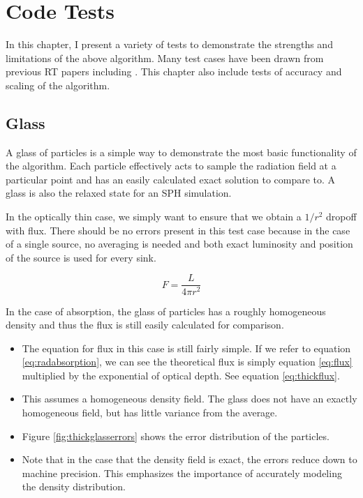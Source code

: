 \pagestyle{fancy}
\headheight 20pt
\chead{}
\lfoot{}
\cfoot{\thepage}
\rfoot{}
\renewcommand{\headrulewidth}{0.1pt}
\renewcommand{\footrulewidth}{0.1pt}


\chapter{Code Tests}
\label{chap:codetests}
\thispagestyle{fancy}

In this chapter, I present a variety of tests to demonstrate the strengths and limitations of the above algorithm. Many test cases have been drawn from previous RT papers including \citet{ilievEt06,gendelevKrumholz12,skinnerOstriker13}. This chapter also include tests of accuracy and scaling of the algorithm.

\section{Glass}
\label{sec:glass}

A glass of particles is a simple way to demonstrate the most basic functionality of the algorithm. Each particle effectively acts to sample the radiation field at a particular point and has an easily calculated exact solution to compare to. A glass is also the relaxed state for an SPH simulation.

In the optically thin case, we simply want to ensure that we obtain a $1/r^2$ dropoff with flux. There should be no errors present in this test case because in the case of a single source, no averaging is needed and both exact luminosity and position of the source is used for every sink.

\begin{equation}
\label{eq:flux}
F = \frac{L}{4\pi r^2}
\end{equation}

In the case of absorption, the glass of particles has a roughly homogeneous density and thus the flux is still easily calculated for comparison.

\begin{itemize}
\item The equation for flux in this case is still fairly simple. If we refer to equation \ref{eq:radabsorption}, we can see the theoretical flux is simply equation \ref{eq:flux} multiplied by the exponential of optical depth. See equation \ref{eq:thickflux}.
\item This assumes a homogeneous density field. The glass does not have an exactly homogeneous field, but has little variance from the average.
\item Figure \ref{fig:thickglasserrors} shows the error distribution of the particles.
\item Note that in the case that the density field is exact, the errors reduce down to machine precision. This emphasizes the importance of accurately modeling the density distribution.
\end{itemize}


